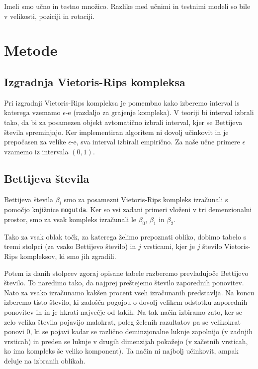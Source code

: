 \documentclass[a4paper,11pt]{article}
\begin{document}
Imeli smo učno in testno množico. Razlike med učnimi in testnimi modeli so bile v velikosti, poziciji in rotaciji.

\section{Metode}

\subsection{Izgradnja Vietoris-Rips kompleksa}

Pri izgradnji Vietoris-Rips kompleksa je pomembno kako izberemo interval is katerega vzemamo $\epsilon$-e (razdaljo za grajenje kompleka). V teoriji bi interval izbrali tako, da bi za posamezen objekt avtomatično izbrali interval, kjer se Bettijeva števila spreminjajo. Ker implementiran algoritem ni dovolj učinkovit in je prepočasen za velike $\epsilon$-e, sva interval izbirali empirično. Za naše učne primere $\epsilon$ vzamemo iz intervala $(0, 1)$.





\subsection{Bettijeva števila}
Bettijeva števila $\beta_i$ smo za posamezni Vietoris-Rips kompleks izračunali s pomočjo knjižnice \texttt{mogutda}. Ker so vsi zadani primeri vloženi v tri demenzionalni prostor, smo za vsak kompleks izračunali le $\beta_0$, $\beta_1$ in $\beta_2$. \par
Tako za vsak oblak točk, za katerega želimo prepoznati obliko, dobimo tabelo s tremi stolpci (za vsako Bettijevo  število) in $j$ vrsticami, kjer je $j$ število Vietoris-Rips kompleksov, ki smo jih zgradili.\par
Potem iz danih stolpcev zgoraj opisane tabele razberemo prevladujoče Bettijevo število. To naredimo tako, da najprej preštejemo število zaporednih ponovitev. Nato za vsako izračunamo kakšen procent vseh izračunanih predstavlja. Na koncu izberemo tisto število, ki zadošča pogojou o dovolj velikem odstotku zaporednih ponovitev in in je hkrati največje od takih. Na tak način izbiramo  zato, ker se zelo velika števila pojavijo malokrat, poleg želenih razultatov pa se velikokrat ponovi $0$, ki se pojavi kadar se različno deminzjonalne luknje zapolnijo (v zadnjih vrsticah) in preden se luknje v drugih dimenzijah pokažejo (v začetnih vrsticah, ko ima kompleks še veliko komponent). Ta način ni najbolj učinkovit, ampak deluje na izbranih oblikah. \par
\end{document}
